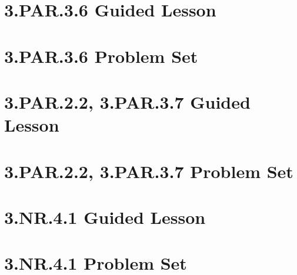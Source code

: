 \documentclass[a4paper,12pt]{article}
\begin{document}
\newpage
\section{3.PAR.3.6 Guided Lesson}


\newpage
\section{3.PAR.3.6 Problem Set}


\newpage
\section{3.PAR.2.2, 3.PAR.3.7 Guided Lesson}


\newpage
\section{3.PAR.2.2, 3.PAR.3.7 Problem Set}


\newpage
\section{3.NR.4.1 Guided Lesson}


\newpage
\section{3.NR.4.1 Problem Set}

\end{document}
